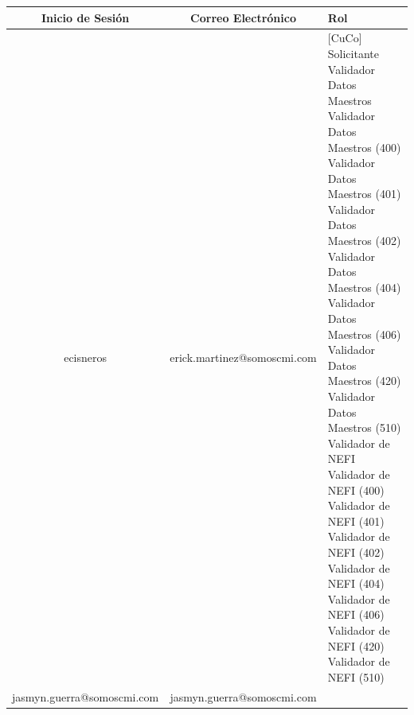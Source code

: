 \begin{longtable}{|c|c|p{7cm}|}
        \hline
        Inicio de Sesión & Correo Electrónico & Rol \\
        \hline
        ecisneros & erick.martinez@somoscmi.com & 
        [CuCo] Solicitante \newline
        [CuCo] Validador Datos Maestros \newline
        [CuCo] Validador Datos Maestros (400) \newline
        [CuCo] Validador Datos Maestros (401) \newline 
        [CuCo] Validador Datos Maestros (402) \newline
        [CuCo] Validador Datos Maestros (404) \newline
        [CuCo] Validador Datos Maestros (406) \newline
        [CuCo] Validador Datos Maestros (420) \newline
        [CuCo] Validador Datos Maestros (510) \newline
        [CuCo] Validador de NEFI \newline
        [CuCo] Validador de NEFI (400) \newline
        [CuCo] Validador de NEFI (401) \newline
        [CuCo] Validador de NEFI (402) \newline
        [CuCo] Validador de NEFI (404) \newline
        [CuCo] Validador de NEFI (406) \newline
        [CuCo] Validador de NEFI (420) \newline
        [CuCo] Validador de NEFI (510) \newline

         \\
        \hline
        jasmyn.guerra@somoscmi.com & jasmyn.guerra@somoscmi.com & 


\end{longtable}
